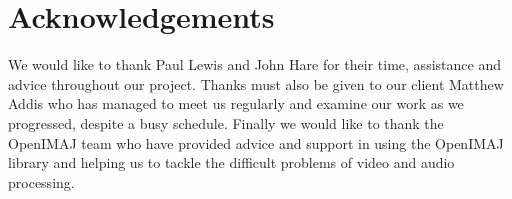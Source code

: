 \section*{Acknowledgements}

We would like to thank Paul Lewis and John Hare for their time, assistance and advice
throughout our project. Thanks must also be given to our client Matthew Addis who
has managed to meet us regularly and examine our work as we progressed, despite a busy
schedule. Finally we would like to thank the OpenIMAJ team who have provided advice and support in using the OpenIMAJ library and helping us to tackle the difficult problems of video and audio processing.
